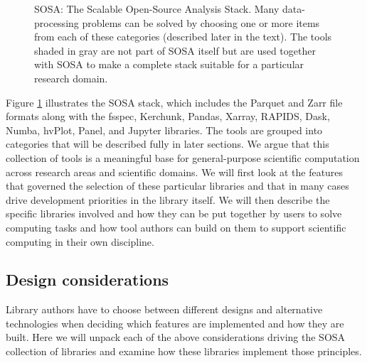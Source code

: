 \begin{figure}[t]
    \noindent{}
    \caption{SOSA: The Scalable Open-Source Analysis Stack\label{sosa}. Many data-processing problems can be solved by choosing one or more items from each of these categories (described later in the text). The tools shaded in gray are not part of SOSA itself but are used together with SOSA to make a complete stack suitable for a particular research domain.}
\end{figure}
Figure \ref{sosa} illustrates the SOSA stack, which includes the Parquet and Zarr file formats along with the fsspec, Kerchunk, Pandas, Xarray, RAPIDS, Dask, Numba, hvPlot, Panel, and Jupyter libraries. The tools are grouped into categories that will be described fully in later sections. We argue that this collection of tools is a meaningful base for general-purpose scientific computation across research areas and scientific domains. We will first look at the features that governed the selection of these particular libraries and that in many cases drive development priorities in the library itself. We will then describe the specific libraries involved and how they can be put together by users to solve computing tasks and how tool authors can build on them to support scientific computing in their own discipline.

\subsection{Design considerations}

Library authors have to choose between different designs and alternative technologies when deciding which features are implemented and how they are built.  Here we will unpack each of the above considerations driving the SOSA collection of libraries and examine how these libraries implement those principles.

